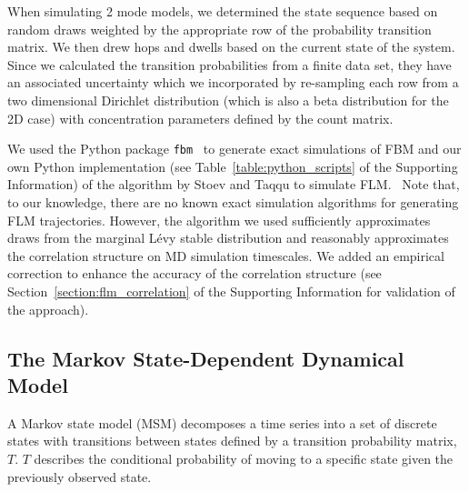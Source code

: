 \documentclass[journal=ancac3,manuscript=article,layout=twocolumn]{achemso}
\begin{document}
  When simulating 2 mode models, we determined the state sequence based on
  random draws weighted by the appropriate row of the probability transition
  matrix. We then drew hops and dwells based on the current state of the
  system. Since we calculated the transition probabilities from a finite data
  set, they have an associated uncertainty which we incorporated by re-sampling
  each row from a two dimensional Dirichlet distribution (which is also a beta
  distribution for the 2D case) with concentration parameters defined by the
  count matrix.~\cite{bacallado_bayesian_2009}
  
  We used the Python package \texttt{fbm}~\cite{flynn_exact_2019} to generate exact simulations of FBM
  and our own Python implementation (see Table~\ref{table:python_scripts} of
  the Supporting Information) of the algorithm by Stoev and Taqqu to
  simulate FLM.~\cite{stoev_simulation_2004} Note that, to our knowledge, there
  are no known exact simulation algorithms for generating FLM trajectories.
  However, the algorithm we used sufficiently approximates draws from the
  marginal L\'evy stable distribution and reasonably approximates the
  correlation structure on MD simulation timescales. We added an empirical
  correction to enhance the accuracy of the correlation structure (see
  Section~\ref{section:flm_correlation} of the Supporting Information for
  validation of the approach).

  \subsection{The Markov State-Dependent Dynamical Model}\label{method:MSMs}  

  A Markov state model (MSM) decomposes a time series into a set of discrete
  states with transitions between states defined by a transition probability
  matrix, $T$.  $T$ describes the conditional probability of moving to a
  specific state given the previously observed
  state.~\cite{pande_everything_2010,wehmeyer_introduction_2018}
\end{document}
